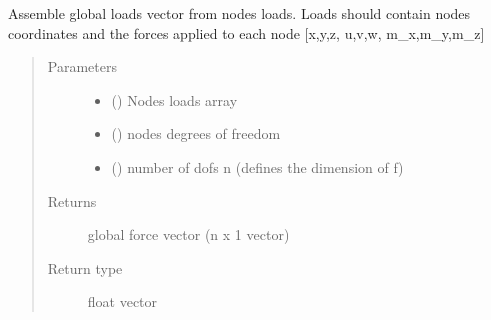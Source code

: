 \documentclass[letterpaper,10pt,english]{sphinxmanual}
\begin{document}
\begin{fulllineitems}
\label{\detokenize{api:beamon.core.assemble_global_f}}
Assemble global loads vector from nodes loads.
Loads should contain nodes coordinates and the forces applied to each node {[}x,y,z, u,v,w, m\_x,m\_y,m\_z{]}
\begin{quote}\begin{description}
\item[{Parameters}] \leavevmode\begin{itemize}
\item {} 
 () \textendash{} Nodes loads array

\item {} 
 () \textendash{} nodes degrees of freedom

\item {} 
 () \textendash{} number of dofs n (defines the dimension of f)

\end{itemize}

\item[{Returns}] \leavevmode
global force vector (n x 1 vector)

\item[{Return type}] \leavevmode
float vector

\end{description}\end{quote}

\end{fulllineitems}

\end{document}
